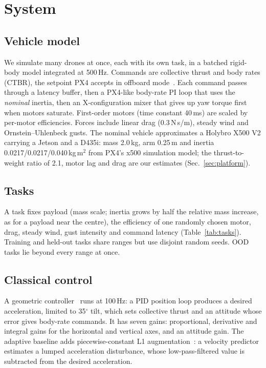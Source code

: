 \section{System}\label{sec:system}

\subsection{Vehicle model}
We simulate many drones at once, each with its own task, in a batched rigid-body model integrated at 500\,Hz. Commands are collective thrust and body rates (CTBR), the setpoint PX4 accepts in offboard mode~\cite{meier2015px4}. Each command passes through a latency buffer, then a PX4-like body-rate PI loop that uses the \emph{nominal} inertia, then an X-configuration mixer that gives up yaw torque first when motors saturate. First-order motors (time constant 40\,ms) are scaled by per-motor efficiencies. Forces include linear drag (0.3\,N\,s/m), steady wind and Ornstein--Uhlenbeck gusts. The nominal vehicle approximates a Holybro X500 V2 carrying a Jetson and a D435i: mass 2.0\,kg, arm 0.25\,m and inertia 0.0217/0.0217/0.040\,kg\,m$^2$ from PX4's x500 simulation model; the thrust-to-weight ratio of 2.1, motor lag and drag are our estimates (Sec.~\ref{sec:platform}).

\subsection{Tasks}
A task fixes payload (mass scale; inertia grows by half the relative mass increase, as for a payload near the centre), the efficiency of one randomly chosen motor, drag, steady wind, gust intensity and command latency (Table~\ref{tab:tasks}). Training and held-out tasks share ranges but use disjoint random seeds. OOD tasks lie beyond every range at once.

\begin{table}[t]
\centering
\caption{Task distribution. Each task draws every parameter from the given range.}
\label{tab:tasks}
\footnotesize

\end{table}

\subsection{Classical control}
A geometric controller~\cite{lee2010geometric} runs at 100\,Hz: a PID position loop produces a desired acceleration, limited to 35$^\circ$ tilt, which sets collective thrust and an attitude whose error gives body-rate commands. It has seven gains: proportional, derivative and integral gains for the horizontal and vertical axes, and an attitude gain. The adaptive baseline adds piecewise-constant L1 augmentation~\cite{wu2022l1quad}: a velocity predictor estimates a lumped acceleration disturbance, whose low-pass-filtered value is subtracted from the desired acceleration.

